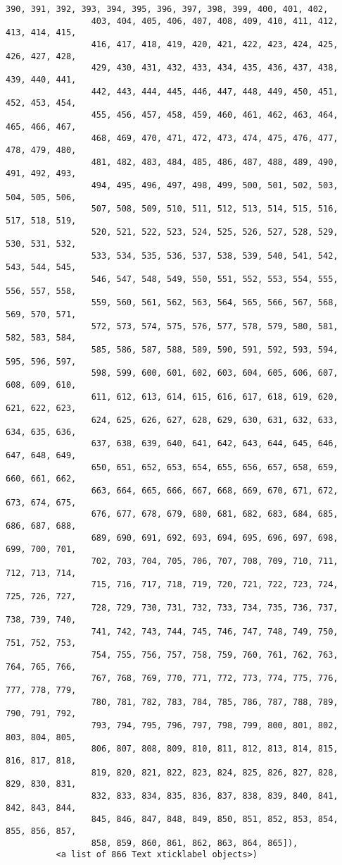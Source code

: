 \documentclass[11pt]{article}
\begin{document}
\begin{Verbatim}[commandchars=\\\{\}]
                 390, 391, 392, 393, 394, 395, 396, 397, 398, 399, 400, 401, 402,
                 403, 404, 405, 406, 407, 408, 409, 410, 411, 412, 413, 414, 415,
                 416, 417, 418, 419, 420, 421, 422, 423, 424, 425, 426, 427, 428,
                 429, 430, 431, 432, 433, 434, 435, 436, 437, 438, 439, 440, 441,
                 442, 443, 444, 445, 446, 447, 448, 449, 450, 451, 452, 453, 454,
                 455, 456, 457, 458, 459, 460, 461, 462, 463, 464, 465, 466, 467,
                 468, 469, 470, 471, 472, 473, 474, 475, 476, 477, 478, 479, 480,
                 481, 482, 483, 484, 485, 486, 487, 488, 489, 490, 491, 492, 493,
                 494, 495, 496, 497, 498, 499, 500, 501, 502, 503, 504, 505, 506,
                 507, 508, 509, 510, 511, 512, 513, 514, 515, 516, 517, 518, 519,
                 520, 521, 522, 523, 524, 525, 526, 527, 528, 529, 530, 531, 532,
                 533, 534, 535, 536, 537, 538, 539, 540, 541, 542, 543, 544, 545,
                 546, 547, 548, 549, 550, 551, 552, 553, 554, 555, 556, 557, 558,
                 559, 560, 561, 562, 563, 564, 565, 566, 567, 568, 569, 570, 571,
                 572, 573, 574, 575, 576, 577, 578, 579, 580, 581, 582, 583, 584,
                 585, 586, 587, 588, 589, 590, 591, 592, 593, 594, 595, 596, 597,
                 598, 599, 600, 601, 602, 603, 604, 605, 606, 607, 608, 609, 610,
                 611, 612, 613, 614, 615, 616, 617, 618, 619, 620, 621, 622, 623,
                 624, 625, 626, 627, 628, 629, 630, 631, 632, 633, 634, 635, 636,
                 637, 638, 639, 640, 641, 642, 643, 644, 645, 646, 647, 648, 649,
                 650, 651, 652, 653, 654, 655, 656, 657, 658, 659, 660, 661, 662,
                 663, 664, 665, 666, 667, 668, 669, 670, 671, 672, 673, 674, 675,
                 676, 677, 678, 679, 680, 681, 682, 683, 684, 685, 686, 687, 688,
                 689, 690, 691, 692, 693, 694, 695, 696, 697, 698, 699, 700, 701,
                 702, 703, 704, 705, 706, 707, 708, 709, 710, 711, 712, 713, 714,
                 715, 716, 717, 718, 719, 720, 721, 722, 723, 724, 725, 726, 727,
                 728, 729, 730, 731, 732, 733, 734, 735, 736, 737, 738, 739, 740,
                 741, 742, 743, 744, 745, 746, 747, 748, 749, 750, 751, 752, 753,
                 754, 755, 756, 757, 758, 759, 760, 761, 762, 763, 764, 765, 766,
                 767, 768, 769, 770, 771, 772, 773, 774, 775, 776, 777, 778, 779,
                 780, 781, 782, 783, 784, 785, 786, 787, 788, 789, 790, 791, 792,
                 793, 794, 795, 796, 797, 798, 799, 800, 801, 802, 803, 804, 805,
                 806, 807, 808, 809, 810, 811, 812, 813, 814, 815, 816, 817, 818,
                 819, 820, 821, 822, 823, 824, 825, 826, 827, 828, 829, 830, 831,
                 832, 833, 834, 835, 836, 837, 838, 839, 840, 841, 842, 843, 844,
                 845, 846, 847, 848, 849, 850, 851, 852, 853, 854, 855, 856, 857,
                 858, 859, 860, 861, 862, 863, 864, 865]),
          <a list of 866 Text xticklabel objects>)
\end{Verbatim}
            
\end{document}
